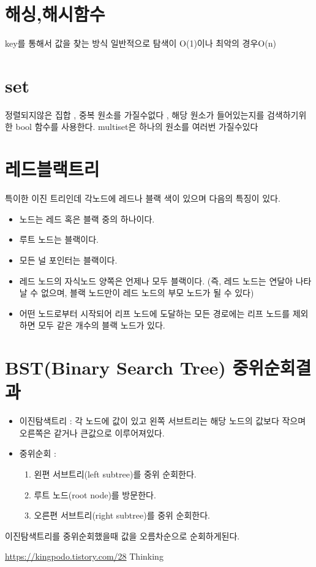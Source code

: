 \documentclass{oblivoir}
\begin{document}
\section{해싱,해시함수}
key를 통해서 값을 찾는 방식 일반적으로 탐색이 O(1)이나 최악의 경우O(n)


\section{set}
정렬되지않은 집합 , 중복 원소를 가질수없다 , 해당 원소가 들어있는지를 검색하기위한 bool 함수를 사용한다.
multiset은 하나의 원소를 여러번 가질수있다

\section{레드블랙트리}
특이한 이진 트리인데 각노드에 레드나 블랙 색이 있으며 다음의 특징이 있다. 
\begin{itemize}
    \item 노드는 레드 혹은 블랙 중의 하나이다.
    \item 루트 노드는 블랙이다.
    \item 모든 널 포인터는 블랙이다.
    \item 레드 노드의 자식노드 양쪽은 언제나 모두 블랙이다. (즉, 레드 노드는 연달아 나타날 수 없으며, 블랙 노드만이 레드 노드의 부모 노드가 될 수 있다)
    \item 어떤 노드로부터 시작되어 리프 노드에 도달하는 모든 경로에는 리프 노드를 제외하면 모두 같은 개수의 블랙 노드가 있다.
\end{itemize}

\section{BST(Binary Search Tree) 중위순회결과}
\begin{itemize}
    \item 이진탐색트리 : 각 노드에 값이 있고 왼쪽 서브트리는 해당 노드의 값보다 작으며 오른쪽은 같거나 큰값으로 이루어져있다.
    \item  중위순회 : 
    \begin{enumerate}
        \item 왼편 서브트리(left subtree)를 중위 순회한다.
        \item 루트 노드(root node)를 방문한다.
        \item 오른편 서브트리(right subtree)를 중위 순회한다.
    \end{enumerate}
\end{itemize}
이진탐색트리를 중위순회했을때 값을 오름차순으로 순회하게된다.

\url{https://kingpodo.tistory.com/28}
Thinking
    
\end{document}
